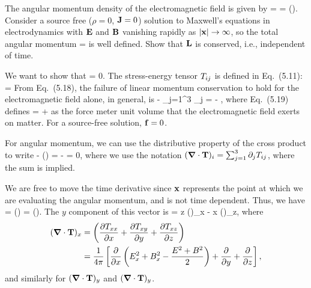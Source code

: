 \begin{statement}{}
	The angular momentum density of the electromagnetic field is given by
	\beq
		\vl = \vx \times \vcP
		=  \vx \times (\vE \times \vB).
	\eeq
	Consider a source free ($\rho = 0$, $\vb{J} = 0$) solution to Maxwell's equations in electrodynamics with $\vb{E}$ and $\vb{B}$ vanishing rapidly as $\abs{\vb{x}} \to \infty$, so the total angular momentum
	\beq
		\vL = \int \vl \dcx
	\eeq
	is well defined.  Show that $\vb{L}$ is conserved, i.e., independent of time.
\end{statement}

\begin{solution}
	We want to show that
	\beq
		 = 0.
	\eeq
	The stress-energy tensor $T_{ij}$ is defined in Eq.~(5.11):
	\beq
		\Tij =  
	\eeq
	From Eq.~(5.18), the failure of linear momentum conservation to hold for the electromagnetic field alone, in general, is
	\beq
		 - \sum_{j=1}^3 \partial_j \Tij = - ,
	\eeq
	where Eq.~(5.19) defines
	\beq
		\vf = \rho \vE +  \vJ \times \vB
	\eeq
	as the force meter unit volume that the electromagnetic field exerts on matter.  For a source-free solution, $\vb{f} = 0$.
	
	For angular momentum, we can use the distributive property of the cross product to write
	\beq
		\vx \times {} - \vx \times (\grad \cdot \vT) = - \vx \times \vf = 0,
	\eeq
	where we use the notation $(\grad \cdot \vb{T})_i = \sum_{j=1}^3 \partial_j T_{ij}$, where the sum is implied.
	
	We are free to move the time derivative since $\vb{x}$ represents the point at which we are evaluating the angular momentum, and is not time dependent.  Thus, we have
	\beq
		 =  (\vx \times \cP) = \vx \times (\grad \cdot \vT).
	\eeq
	The $y$ component of this vector is
	\beq
		 = z (\grad \cdot \vT)_x - x (\grad \cdot \vT)_z,
	\eeq
	where
	\begin{align*}
		(\grad \cdot \vb{T})_x &= \left( \pdv{T_{xx}}{x} + \pdv{T_{xy}}{y} + \pdv{T_{xz}}{z} \right) \\
		&= \frac{1}{4\pi} \left[ \pdv{}{x} \left( E_x^2 + B_x^2 - \frac{E^2 + B^2}{2} \right) + \pdv{}{y} (E_x E_y + B_x B_y) + \pdv{}{z} (E_x E_z + B_x B_z) \right],
	\end{align*}
	and similarly for $(\grad \cdot \vb{T})_y$ and $(\grad \cdot \vb{T})_y$.
	

\end{solution}
